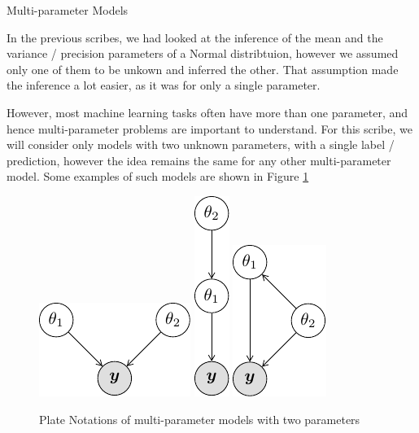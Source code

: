 \documentclass{article}
\begin{document}
\makeheader

\begin{ssection}[1]{Multi-parameter Models}

	In the previous scribes, we had looked at the inference of the mean and the variance / precision parameters of a Normal distribtuion, however we assumed only one of them to be unkown and inferred the other. That assumption made the inference a lot easier, as it was for only a single parameter. \br

	However, most machine learning tasks often have more than one parameter, and hence multi-parameter problems are important to understand. For this scribe, we will consider only models with two unknown parameters, with a single label / prediction, however the idea remains the same for any other multi-parameter model. Some examples of such models are shown in Figure \ref{fig:multi-models}

	\begin{figure}[h!]
		\centering
		\includegraphics{includes/scribe04/multi-parameter-models-1.pdf}
		\hspace{2cm}
		\includegraphics{includes/scribe04/multi-parameter-models-2.pdf}
		\hspace{2cm}
		\includegraphics{includes/scribe04/multi-parameter-models-3.pdf}
		\caption{Plate Notations of multi-parameter models with two parameters}
		\label{fig:multi-models}
	\end{figure}


\end{ssection}
\end{document}
